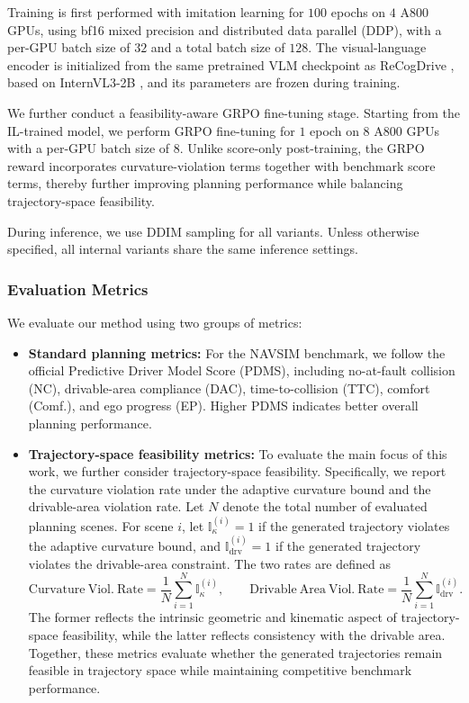 \documentclass[3p,times,authoryear]{elsarticle}
\begin{document}
Training is first performed with imitation learning for \(100\) epochs on \(4\) A800 GPUs, using bf16 mixed precision and distributed data parallel (DDP), with a per-GPU batch size of \(32\) and a total batch size of \(128\). The visual-language encoder is initialized from the same pretrained VLM checkpoint as ReCogDrive \citep{li2025recogdrive}, based on InternVL3-2B \citep{chen2024internvl}, and its parameters are frozen during training.

We further conduct a feasibility-aware GRPO fine-tuning stage. Starting from the IL-trained model, we perform GRPO fine-tuning for \(1\) epoch on \(8\) A800 GPUs with a per-GPU batch size of \(8\). Unlike score-only post-training, the GRPO reward incorporates curvature-violation terms together with benchmark score terms, thereby further improving planning performance while balancing trajectory-space feasibility.

During inference, we use DDIM sampling for all variants. Unless otherwise specified, all internal variants share the same inference settings.

\subsubsection{Evaluation Metrics}

We evaluate our method using two groups of metrics:
\begin{itemize}[leftmargin=1.4em]
    \item \textbf{Standard planning metrics:} For the NAVSIM benchmark, we follow the official Predictive Driver Model Score (PDMS), including no-at-fault collision (NC), drivable-area compliance (DAC), time-to-collision (TTC), comfort (Comf.), and ego progress (EP). Higher PDMS indicates better overall planning performance.

    \item \textbf{Trajectory-space feasibility metrics:} To evaluate the main focus of this work, we further consider trajectory-space feasibility. Specifically, we report the curvature violation rate under the adaptive curvature bound and the drivable-area violation rate. Let \(N\) denote the total number of evaluated planning scenes. For scene \(i\), let \(\mathbb{I}^{(i)}_{\kappa}=1\) if the generated trajectory violates the adaptive curvature bound, and \(\mathbb{I}^{(i)}_{\mathrm{drv}}=1\) if the generated trajectory violates the drivable-area constraint. The two rates are defined as
    \begin{equation}
    \mathrm{Curvature\ Viol.\ Rate}
    =
    \frac{1}{N}\sum_{i=1}^{N}\mathbb{I}^{(i)}_{\kappa},
    \qquad
    \mathrm{Drivable\ Area\ Viol.\ Rate}
    =
    \frac{1}{N}\sum_{i=1}^{N}\mathbb{I}^{(i)}_{\mathrm{drv}}.
    \end{equation}
    The former reflects the intrinsic geometric and kinematic aspect of trajectory-space feasibility, while the latter reflects consistency with the drivable area. Together, these metrics evaluate whether the generated trajectories remain feasible in trajectory space while maintaining competitive benchmark performance.

\end{itemize}
\end{document}
